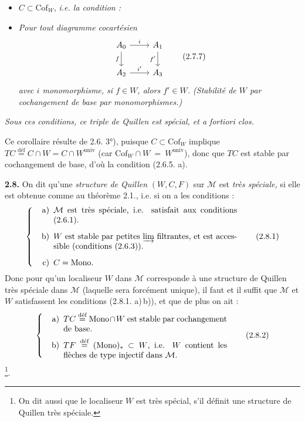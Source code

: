\documentclass[11pt]{article}
\newcommand{\printedpage}[1]{\marginpar{\footnotesize p.~#1}}
\newcommand{\msp}[1]{\marginpar{\footnotesize [#1]}}
\newcommand{\deq}{\overset{\text{déf}}{=}}
\newcommand{\Mono}{\mathrm{Mono}}
\newcommand{\Cof}{\mathrm{Cof}}
\begin{document}
\begin{itemize}[leftmargin=7em]
\item[] $C \subset \Cof_W$, \textit{i.e. la condition :}
\item[a$'$)] \textit{Pour tout diagramme cocartésien}
\[ \begin{tikzcd}
A_0 \arrow[r, "i"] \arrow[d, "f"'] & A_1 \arrow[d, "f'"'] \\
A_2 \arrow[r, "i'"] & A_3
\end{tikzcd} \tag*{(2.7.7)} \]
\textit{avec $i$ monomorphisme, si $f \in W$, alors $f' \in W$. (Stabilité de $W$ par cochangement de base par monomorphismes.)}
\end{itemize}

\textit{Sous ces conditions, ce triple de Quillen est spécial, et a fortiori clos.}

Ce corollaire résulte de 2.6. 3°), puisque $C \subset \Cof_W$ implique $TC \deq C\cap W = C\cap W^{\mathrm{univ}}$ (car $\Cof_W \cap W \ = \ W^{\mathrm{univ}}$), donc que $TC$ est stable par cochangement de base, d'où la condition (2.6.5. a).

\printedpage{17}

\textbf{2.8.} On dit qu'une \textit{structure de Quillen} $(W,C,F)$ sur $\mathcal{M}$ est \textit{très spéciale,} si elle est obtenue comme au théorème 2.1., i.e. si on a les conditions :
\[ \left\{ \begin{minipage}{0.72\textwidth}
\begin{itemize}[leftmargin=2.5em]
\item[a)] $\mathcal{M}$ est très spéciale, i.e. satisfait aux conditions (2.6.1).
\item[b)] $W$ est stable par petites $\varinjlim$ filtrantes, et est accessible (conditions (2.6.3)).
\item[c)] $C = \Mono$.
\end{itemize}
\end{minipage}\right. \tag*{(2.8.1)} \]
Donc pour qu'un localiseur $W$ dans $\mathcal{M}$ corresponde à une structure de Quillen très spéciale \msp{page 28} dans $\mathcal{M}$ (laquelle sera forcément unique), il faut et il suffit que $\mathcal{M}$ et $W$ satisfassent les conditions (2.8.1. a)\,b)), et que de plus on ait :
\[ \left\{ \begin{minipage}{0.65\textwidth}
\begin{itemize}[leftmargin=2.5em]
\item[a)] $TC \deq \Mono\cap W$ est stable par cochangement de base.
\item[b)] $TF \deq (\Mono)_* \subset W$, i.e. $W$ contient les flèches de type injectif dans $\mathcal{M}$.
\end{itemize}
\end{minipage}\right. \tag*{(2.8.2)} \]
\footnote[16]{On dit aussi que le localiseur $W$ est très spécial, s'il définit une structure de Quillen très spéciale.}.
\end{document}
